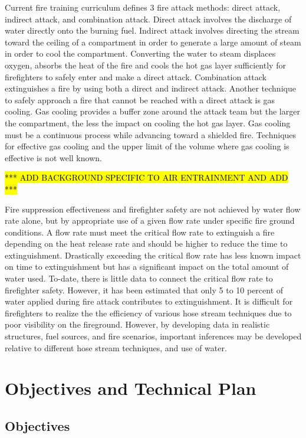 \documentclass{article}
\begin{document}
Current fire training curriculum defines 3 fire attack methods: direct attack, indirect attack, and combination attack. Direct attack involves the discharge of water directly onto the burning fuel. Indirect attack involves directing the stream toward the ceiling of a compartment in order to generate a large amount of steam in order to cool the compartment. Converting the water to steam displaces oxygen, absorbs the heat of the fire and cools the hot gas layer sufficiently for firefighters to safely enter and make a direct attack. Combination attack extinguishes a fire by using both a direct and indirect attack. Another technique to safely approach a fire that cannot be reached with a direct attack is gas cooling. Gas cooling provides a buffer zone around the attack team but the larger the compartment, the less the impact on cooling the hot gas layer. Gas cooling must be a continuous process while advancing toward a shielded fire. Techniques for effective gas cooling and the upper limit of the volume where gas cooling is effective is not well known.  

\hl{*** ADD BACKGROUND SPECIFIC TO AIR ENTRAINMENT AND ADD ***}

Fire suppression effectiveness and firefighter safety are not achieved by water flow rate alone, but by appropriate use of a given flow rate under specific fire ground conditions. A flow rate must meet the critical flow rate to extinguish a fire depending on the heat release rate and should be higher to reduce the time to extinguishment. Drastically exceeding the critical flow rate has less known impact on time to extinguishment but has a significant impact on the total amount of water used. To-date, there is little data to connect the critical flow rate to firefighter safety. However, it has been estimated that only 5 to 10 percent of water applied during fire attack contributes to extinguishment. It is difficult for firefighters to realize the the efficiency of various hose stream techniques due to poor visibility on the fireground. However, by developing data in realistic structures, fuel sources, and fire scenarios, important inferences may be developed relative to different hose stream techniques, and use of water.

\clearpage

\section{Objectives and Technical Plan}

\subsection {Objectives}
\end{document}

